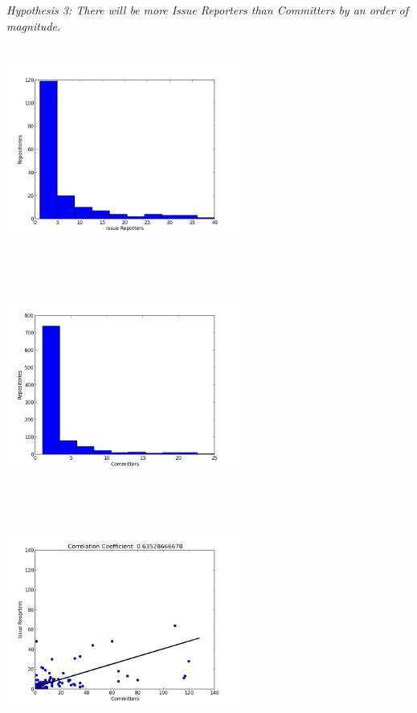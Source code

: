 \documentclass{proc}
\begin{document}
\emph{Hypothesis 3: There will be more Issue Reporters than Committers by an order of magnitude.}\\
\includegraphics[height=3in,width=3in]{images/issue_reporters_histogram.png}
\includegraphics[height=3in,width=3in]{images/committers_histogram.png}
\includegraphics[height=3in,width=3in]{images/issue_reporters_committers_scatterplot.png}
\end{document}
